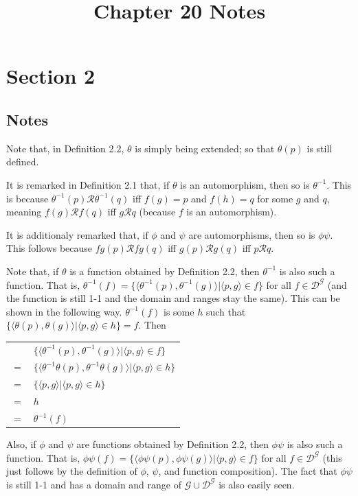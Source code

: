 \documentclass{article}
\title{Chapter 20 Notes}
\theoremstyle{definition}
\begin{document}
\date{}
\maketitle

\section*{Section 2}

\subsection*{Notes}
Note that, in Definition 2.2, $\theta$ is simply being extended; so that $\theta(p)$ is still defined.

It is remarked in Definition 2.1 that, if $\theta$ is an automorphism, then so is $\theta^{-1}$. This is because 
$\theta^{-1}(p)\mathcal{R}\theta^{-1}(q)$ iff $f(g)=p$ and $f(h)=q$ for some $g$ and $q$, meaning 
$f(g)\mathcal{R}f(q)$ iff $g\mathcal{R}q$ (because $f$ is an automorphism).

It is additionaly remarked that, if $\phi$ and $\psi$ are automorphisms, then so is $\phi\psi$. This follows because 
$fg(p)\mathcal{R}fg(q)$ iff $g(p)\mathcal{R}g(q)$ iff $p\mathcal{R}q$.

Note that, if $\theta$ is a function obtained by Definition 2.2, then 
$\theta^{-1}$ is also such a function. That is, 
$\theta^{-1}(f)=\{\langle\theta^{-1}(p),\theta^{-1}(g)\rangle|\langle p,g\rangle\in f\}$ for 
all $f\in\mathcal{D}^\mathcal{G}$ (and the function is still 1-1 and the domain and ranges stay the same). This can be shown in the 
following way. $\theta^{-1}(f)$ is some $h$ such that 
$\{\langle\theta(p),\theta(g)\rangle|\langle p,g\rangle\in h\}=f$. Then 
\begin{center}
\begin{tabular}{ll}
& $\{\langle\theta^{-1}(p),\theta^{-1}(g)\rangle|\langle p,g\rangle\in f\}$ \\
$=$ & $\{\langle\theta^{-1}\theta(p),\theta^{-1}\theta(g)\rangle|\langle p,g\rangle\in h\}$ \\
$=$ & $\{\langle p,g\rangle|\langle p,g\rangle\in h\}$ \\
$=$ & $h$ \\
$=$ & $\theta^{-1}(f)$
\end{tabular}
\end{center}

Also, if $\phi$ and $\psi$ are functions obtained by Definition 2.2, then 
$\phi\psi$ is also such a function. 
That is, $\phi\psi(f)=\{\langle\phi\psi(p),\phi\psi(g)\rangle|\langle p,g\rangle\in f\}$ for all 
$f\in\mathcal{D}^\mathcal{G}$ (this just follows by the definition of $\phi$, $\psi$, and function composition).
The fact that $\phi\psi$ is still 1-1 and has a domain and range of $\mathcal{G}\cup\mathcal{D}^\mathcal{G}$ is also easily seen.
\end{document}
